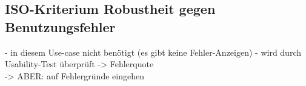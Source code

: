 \subsection*{ISO-Kriterium Robustheit gegen Benutzungsfehler}
-	in diesem Use-case nicht benötigt (es gibt keine Fehler-Anzeigen)
-	wird durch Usability-Test überprüft -> Fehlerquote\\
-> ABER: auf Fehlergründe eingehen

